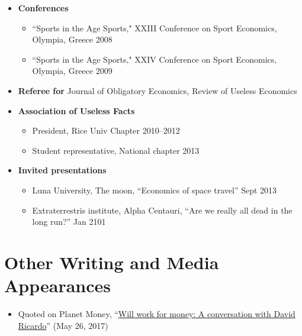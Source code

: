 \documentclass{article}[12]
\begin{document}
\begin{itemize}[itemsep=0.75em]

        \item \textbf{Conferences}
    \begin{itemize}
        \item ``Sports in the Age Sports," XXIII Conference on Sport Economics, Olympia, Greece \hfill 2008
        \item ``Sports in the Age Sports," XXIV Conference on Sport Economics, Olympia, Greece \hfill 2009
    \end{itemize}

    \item \textbf{Referee for} Journal of Obligatory Economics, Review of Useless Economics
    
    \item \textbf{Association of Useless Facts}
    \begin{itemize}
        \item President, Rice Univ Chapter \hfill 2010--2012
        \item Student representative, National chapter \hfill 2013
    \end{itemize}
    
    \item \textbf{Invited presentations}
    \begin{itemize}
        \item Luna University, The moon, ``Economics of space travel'' \hfill Sept 2013
        \item Extraterrestris institute, Alpha Centauri, ``Are we really all dead in the long run?'' \hfill Jan 2101
    \end{itemize}

\end{itemize}

\section{Other Writing and Media Appearances}

\begin{itemize}[itemsep=0.5em]
    \item Quoted on Planet Money, ``\href{https://www.marketplace.org/2017/05/26}{Will work for money: A conversation with David Ricardo}'' (May 26, 2017)
\end{itemize}

\end{document}
